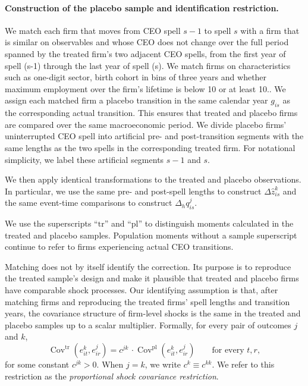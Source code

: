 \documentclass[sigconf,nonacm]{acmart}
\begin{document}
\paragraph{Construction of the placebo sample and identification restriction.}
We match each firm that moves from CEO spell $s-1$ to spell $s$ with a firm that is similar on observables and whose CEO does not change over the full period spanned by the treated firm's two adjacent CEO spells, from the first year of spell (s-1) through the last year of spell (s). We match firms on characteristics such as one-digit sector, birth cohort in bins of three years and whether maximum employment over the firm's lifetime is below 10 or at least 10.. We assign each matched firm a placebo transition in the same calendar year $g_{is}$ as the corresponding actual transition. This ensures that treated and placebo firms are compared over the same macroeconomic period. We divide placebo firms' uninterrupted CEO spell into artificial pre- and post-transition segments with the same lengths as the two spells in the corresponding treated firm. For notational simplicity, we label
these artificial segments $s-1$ and $s$.

{\setlength{\emergencystretch}{1em}
We then apply identical transformations to the treated and placebo observations. In particular, we use the same pre- and post-spell lengths to construct $\Delta\widehat z_{is}^k$ and the same event-time comparisons to construct $\Delta_h q_{is}^j$. 
\par}

We use the superscripts ``$\mathrm{tr}$'' and ``$\mathrm{pl}$'' to distinguish
moments calculated in the treated and placebo samples. Population
moments without a sample superscript continue to refer to firms
experiencing actual CEO transitions.

Matching does not by itself identify the correction. Its purpose is to
reproduce the treated sample's design and make it plausible that
treated and placebo firms have comparable shock processes. Our identifying assumption is that, after matching firms and
reproducing the treated firms' spell lengths and transition years, the
covariance structure of firm-level shocks is the same in the treated
and placebo samples up to a scalar multiplier. Formally, for every pair of outcomes $j$
and $k$,
\begin{equation}
\operatorname{Cov}^{\mathrm{tr}}\!\left(
e_{it}^{k},e_{ir}^{j}
\right)
=
c^{jk}\, \cdot
\operatorname{Cov}^{\mathrm{pl}}\!\left(
e_{it}^{k},e_{ir}^{j}
\right)
\qquad
\text{for every }t,r,
\label{eq:proportional_shock_covariance}
\end{equation}
for some constant $c^{jk}>0$.
When $j=k$, we write $c^k \equiv c^{kk}$.
We refer to this restriction as the
\emph{proportional shock covariance restriction}.
\end{document}
